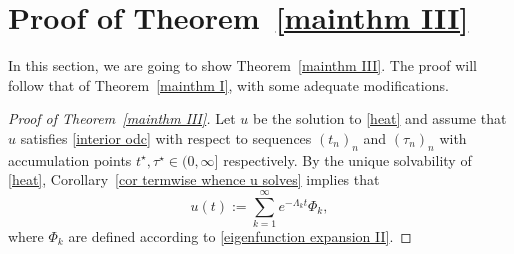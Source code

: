 \documentclass[a4paper,11pt]{article}
\numberwithin{equation}{section}
\begin{document}
\section{Proof of Theorem~\ref{mainthm III}}\label{section pf mainthm III}

In this section, we are going to show Theorem~\ref{mainthm III}. The proof will follow that of Theorem~\ref{mainthm I}, with some adequate modifications. 

\begin{proof}[Proof of Theorem~\ref{mainthm III}]
Let $u$ be the solution to \eqref{heat} and assume that $u$ satisfies \eqref{interior odc} with respect to sequences $(t_n)_n$ and $(\tau_n)_n$ with accumulation points $t^\star,\tau^\star\in (0,\infty]$ respectively. By the unique solvability of \eqref{heat}, Corollary~\ref{cor termwise whence u solves} implies that
\begin{equation}\label{expression for the solution u}
    u(t):=\sum_{k=1}^\infty e^{-\Lambda_k t} \Phi_k, 
\end{equation}
where $\Phi_k$ are defined according to \eqref{eigenfunction expansion II}.


\end{proof}
\end{document}
